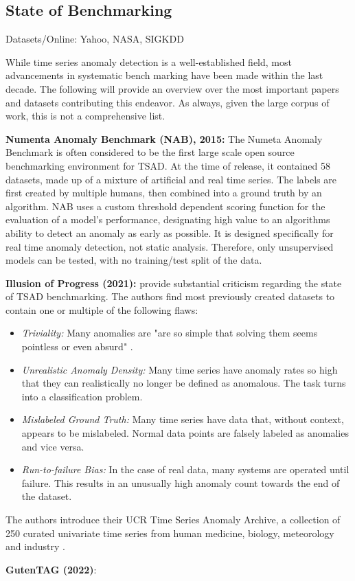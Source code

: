\documentclass[12pt,oneside]{article}
\begin{document}
\textbf{}


\subsection{State of Benchmarking}

Datasets/Online: Yahoo, NASA, SIGKDD

While time series anomaly detection is a well-established field, most advancements in systematic bench marking have been made within the last decade. The following will provide an overview over the most important papers and datasets contributing this endeavor. As always, given the large corpus of work, this is not a comprehensive list.  \par
\textbf{Numenta Anomaly Benchmark (NAB), 2015:} The Numeta Anomaly Benchmark is often considered to be the first large scale open source benchmarking environment for TSAD. At the time of release, it contained 58 datasets, made up of a mixture of artificial and real time series. The labels are first created by multiple humans, then combined into a ground truth by an algorithm. NAB uses a custom threshold dependent scoring function for the evaluation of a model's performance, designating high value to an algorithms ability to detect an anomaly as early as possible. It is designed specifically for real time anomaly detection, not static analysis. Therefore, only unsupervised models can be tested, with no training/test split of the data.\par
\textbf{Illusion of Progress (2021):} \cite{wu2021current} provide substantial criticism regarding the state of TSAD benchmarking. The authors find most previously created datasets to contain one or multiple of the following flaws:
\begin{itemize}
    \item \textit{Triviality:} Many anomalies are "are so simple that solving them seems pointless or even absurd" \parencites[p.~2]{wu2021current}.
    \item \textit{Unrealistic Anomaly Density:} Many time series have anomaly rates so high that they can realistically no longer be defined as anomalous. The task turns into a classification problem.
    \item \textit{Mislabeled Ground Truth:} Many time series have data that, without context, appears to be mislabeled. Normal data points are falsely labeled as anomalies and vice versa.
    \item \textit{Run-to-failure Bias:} In the case of real data, many systems are operated until failure. This results in an unusually high anomaly count towards the end of the dataset.
\end{itemize}
The authors introduce their UCR Time Series Anomaly Archive, a collection of 250 curated univariate time series from human medicine, biology, meteorology and industry \parencite{wu2021current}. \par
\textbf{GutenTAG (2022)}: 
\end{document}
